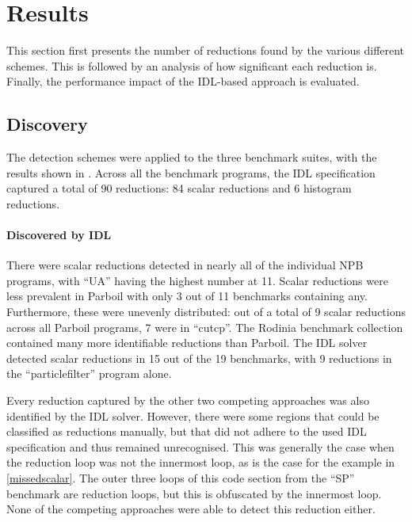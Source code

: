 \section{Results}


    This section first presents the number of reductions found by the various
    different schemes.
    This is followed by an analysis of how significant each reduction is.
    Finally, the performance impact of the IDL-based approach is evaluated.
       
\subsection{Discovery}

    The detection schemes were applied to the three benchmark suites, with the
    results shown in . 
    Across all the benchmark programs, the IDL specification captured a total of
    90 reductions: 84 scalar reductions and 6 histogram reductions.

    \paragraph*{Discovered by IDL}
    There were scalar reductions detected in nearly all of the individual NPB
    programs, with ``UA'' having the highest number at 11.
    Scalar reductions were less prevalent in Parboil with only 3 out of 11
    benchmarks containing any.
    Furthermore, these were unevenly distributed: out of a total of 9 scalar
    reductions across all Parboil programs, 7 were in ``cutcp''.
    The Rodinia benchmark collection contained many more identifiable reductions
    than Parboil.
    The IDL solver detected scalar reductions in 15 out of the 19 benchmarks,
    with 9 reductions in the ``particlefilter'' program alone.

    Every reduction captured by the other two competing approaches was also
    identified by the IDL solver.
    However, there were some regions that could be classified as reductions
    manually, but that did not adhere to the used IDL specification and thus
    remained unrecognised.
    This was generally the case when the reduction loop was not the innermost
    loop, as is the case for the example in \autoref{missedscalar}.
    The outer three loops of this code section from the ``SP'' benchmark are
    reduction loops, but this is obfuscated by the innermost loop.
    None of the competing approaches were able to detect this reduction either.

